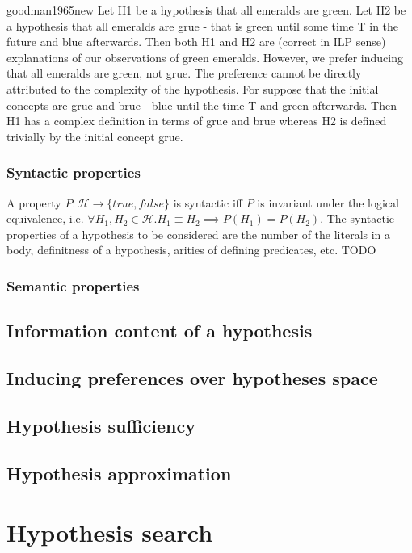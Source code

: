 \begin{cite}{goodman1965new}
Let H1 be a hypothesis that all emeralds are green. Let H2 be a hypothesis that all emeralds are grue - that is green until some time T in the future and blue afterwards. Then both H1 and H2 are (correct in ILP sense) explanations of our observations of green emeralds. However, we prefer inducing that all emeralds are green, not grue. The preference cannot be directly attributed to the complexity of the hypothesis. For suppose that the initial concepts are grue and brue - blue until the time T and green afterwards. Then H1 has a complex definition in terms of grue and brue whereas H2 is defined trivially by the initial concept grue.
\end{cite}

\subsubsection{Syntactic properties}
A property $P:\mathcal{H} \to \{true, false\}$ is syntactic iff $P$ is invariant under the logical equivalence, i.e.
$\forall H_1, H_2 \in \mathcal{H}. H_1 \equiv H_2 \implies P(H_1)=P(H_2)$.
The syntactic properties of a hypothesis to be considered are the number of the literals in a body, definitness of a hypothesis, arities of defining predicates, etc. TODO


\subsubsection{Semantic properties}

\subsection{Information content of a hypothesis}

\subsection{Inducing preferences over hypotheses space}
\subsection{Hypothesis sufficiency}
\subsection{Hypothesis approximation}
\section{Hypothesis search}
